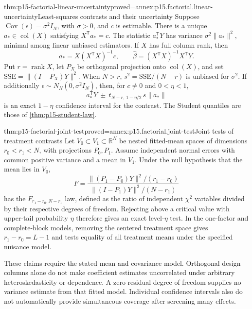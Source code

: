 \begin{hbtheorem}{thm:p15-factorial-linear-uncertainty}{proved=annex:p15.factorial.linear-uncertainty}{Least-squares contrasts and their uncertainty}
Suppose \(\operatorname{Cov}(\epsilon)=\sigma^2I_N\), with
\(\sigma>0\), and \(c\) is estimable. There is a unique
\(a_*\in\operatorname{col}(X)\) satisfying \(X^{\mathsf T}a_*=c\).
The statistic \(a_*^{\mathsf T}Y\) has variance
\(\sigma^2\|a_*\|^2\), minimal among linear unbiased estimators.
If \(X\) has full column rank, then
\[
 a_*=X(X^{\mathsf T}X)^{-1}c,
 \qquad \widehat\beta=(X^{\mathsf T}X)^{-1}X^{\mathsf T}Y.
\]
Put \(r=\operatorname{rank}X\), let \(P_X\) be orthogonal projection
onto \(\operatorname{col}(X)\), and set
\(\mathrm{SSE}=\|(I-P_X)Y\|^2\).
When \(N>r\), \(s^2=\mathrm{SSE}/(N-r)\) is unbiased for \(\sigma^2\).
If additionally \(\epsilon\sim N_N(0,\sigma^2I_N)\), then, for
\(c\ne0\) and \(0<\eta<1\),
\[
 a_*^{\mathsf T}Y\ \pm\ t_{N-r,\,1-\eta/2}\,s\|a_*\|
\]
is an exact \(1-\eta\) confidence interval for the contrast. The
Student quantiles are those of \cref{thm:p15-student-law}.
\end{hbtheorem}

\begin{hbtheorem}{thm:p15-factorial-joint-test}{proved=annex:p15.factorial.joint-test}{Joint tests of treatment contrasts}
Let \(V_0\subset V_1\subset\mathbb R^N\) be nested fitted-mean spaces
of dimensions \(r_0<r_1<N\), with projections \(P_0,P_1\).
Assume independent normal errors with common positive variance and a mean
in \(V_1\). Under the null hypothesis that the mean lies in \(V_0\),
\[
 F=\frac{\|(P_1-P_0)Y\|^2/(r_1-r_0)}
          {\|(I-P_1)Y\|^2/(N-r_1)}
\]
has the \(F_{r_1-r_0,N-r_1}\) law, defined as the ratio of independent
\(\chi^2\) variables divided by their respective degrees of freedom.
Rejecting above a critical value with upper-tail probability \(\eta\)
therefore gives an exact level-\(\eta\) test. In the one-factor and
complete-block models, removing the centered treatment space gives
\(r_1-r_0=L-1\) and tests equality of all treatment means under the
specified nuisance model.
\end{hbtheorem}

These claims require the stated mean and covariance model. Orthogonal design
columns alone do not make coefficient estimates uncorrelated under arbitrary
heteroskedasticity or dependence. A zero residual degree of freedom supplies
no variance estimate from that fitted model. Individual confidence intervals
also do not automatically provide simultaneous coverage after screening many
effects.

